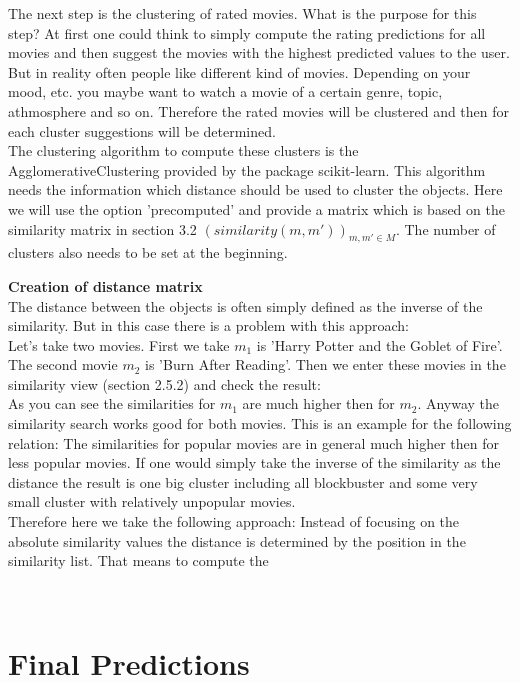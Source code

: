\documentclass{article}
\begin{document}
The next step is the clustering of rated movies. What is the purpose for this step? At first one could think to simply compute the rating predictions for all movies and then suggest the movies with the highest predicted values to the user. But in reality often people like different kind of movies. Depending on your mood, etc. you maybe want to watch a movie of a certain genre, topic, athmosphere and so on. Therefore the rated movies will be clustered and then for each cluster suggestions will be determined.\\
The clustering algorithm to compute these clusters is the AgglomerativeClustering provided by the package scikit-learn. This algorithm needs the information which distance should be used to cluster the objects. Here we will use the option 'precomputed' and provide a matrix which is based on the similarity matrix in section 3.2 $(similarity(m,m'))_{m,m'\in M}$. The number of clusters also needs to be set at the beginning.\\[2ex]
\begin{boxedminipage}{\textwidth}
\textbf{Creation of distance matrix}\\[2ex]
The distance between the objects is often simply defined as the inverse of the similarity. But in this case there is a problem with this approach:\\
Let's take two movies. First we take $m_1$ is 'Harry Potter and the Goblet of Fire'. The second movie $m_2$ is 'Burn After Reading'. Then we enter these movies in the similarity view (section 2.5.2) and check the result:\\
As you can see the similarities for $m_1$ are much higher then for $m_2$. Anyway the similarity search works good for both movies. This is an example for the following relation: The similarities for popular movies are in general much higher then for less popular movies. If one would simply take the inverse of the similarity as the distance the result is one big cluster including all blockbuster and some very small cluster with relatively unpopular movies.\\
Therefore here we take the following approach: Instead of focusing on the absolute similarity values the distance is determined by the position in the similarity list. That means to compute the 
\end{boxedminipage}\\[2ex]



\section{Final Predictions}
\end{document}
